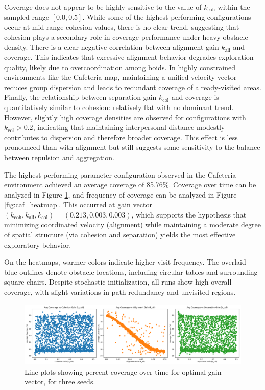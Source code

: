 \documentclass[12pt]{article}
\begin{document}
Coverage does not appear to be highly sensitive to the value of \(k_\text{coh}\) within the sampled range \([0.0, 0.5]\). While some of the highest-performing configurations occur at mid-range cohesion values, there is no clear trend, suggesting that cohesion plays a secondary role in coverage performance under heavy obstacle density. There is a clear negative correlation between alignment gain \(k_\text{ali}\) and coverage. This indicates that excessive alignment behavior degrades exploration quality, likely due to overcoordination among boids. In highly constrained environments like the Cafeteria map, maintaining a unified velocity vector reduces group dispersion and leads to redundant coverage of already-visited areas. Finally, the relationship between separation gain \(k_\text{col}\) and coverage is quantitatively similar to cohesion: relatively flat with no dominant trend. However, slightly high coverage densities are observed for configurations with \(k_\text{col} > 0.2\), indicating that maintaining interpersonal distance modestly contributes to dispersion and therefore broader coverage. This effect is less pronounced than with alignment but still suggests some sensitivity to the balance between repulsion and aggregation.

The highest-performing parameter configuration observed in the Cafeteria environment achieved an average coverage of 85.76\%. Coverage over time can be analyzed in Figure \ref{fig:caf_cov}, and frequency of coverage can be analyzed in Figure \ref{fig:caf_heatmap}. This occurred at gain vector \((k_\text{coh}, k_\text{ali}, k_\text{col}) = (0.213, 0.003, 0.003)\), which supports the hypothesis that minimizing coordinated velocity (alignment) while maintaining a moderate degree of spatial structure (via cohesion and separation) yields the most effective exploratory behavior. 

On the heatmaps, warmer colors indicate higher visit frequency. The overlaid blue outlines denote obstacle locations, including circular tables and surrounding square chairs. Despite stochastic initialization, all runs show high overall coverage, with slight variations in path redundancy and unvisited regions.

\begin{figure}[h!]
    \centering
    \includegraphics[width=\linewidth]{cov_vs_gains/cafeteria_100.png}
    \caption{Line plots showing percent coverage over time for optimal gain vector, for three seeds.}
    \label{fig:caf_cov}
  \end{figure}
\end{document}
